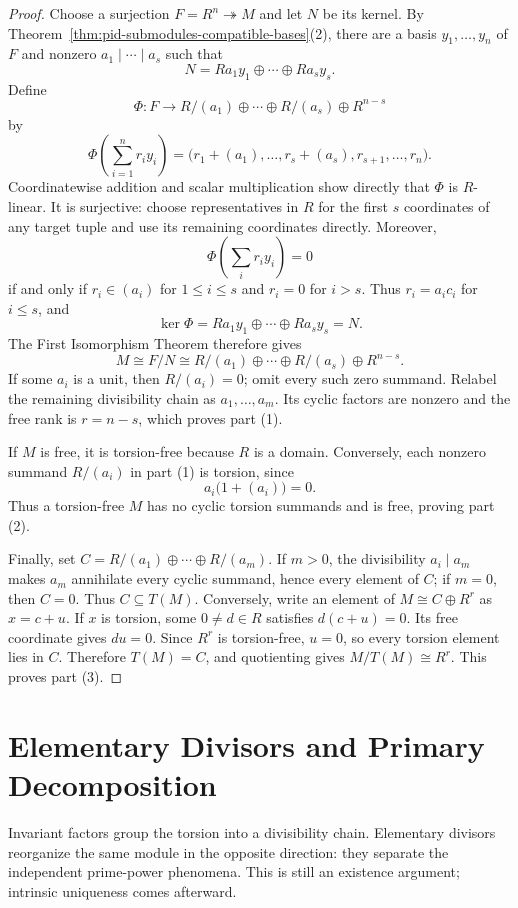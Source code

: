 \begin{proof}
Choose a surjection \(F=R^n\twoheadrightarrow M\) and let \(N\) be its
kernel. By Theorem~\ref{thm:pid-submodules-compatible-bases}(2), there are a basis
\(y_1,\ldots,y_n\) of \(F\) and nonzero \(a_1\mid\cdots\mid a_s\) such that
\[
N=Ra_1y_1\oplus\cdots\oplus Ra_sy_s.
\]
Define
\[
\Phi:F\longrightarrow
R/(a_1)\oplus\cdots\oplus R/(a_s)\oplus R^{n-s}
\]
by
\[
\Phi\left(\sum_{i=1}^n r_iy_i\right)
=\bigl(r_1+(a_1),\ldots,r_s+(a_s),r_{s+1},\ldots,r_n\bigr).
\]
Coordinatewise addition and scalar multiplication show directly that
\(\Phi\) is \(R\)-linear. It is surjective: choose representatives in \(R\)
for the first \(s\) coordinates of any target tuple and use its remaining
coordinates directly. Moreover,
\[
\Phi\left(\sum_i r_iy_i\right)=0
\]
if and only if \(r_i\in(a_i)\) for \(1\leq i\leq s\) and \(r_i=0\) for
\(i>s\). Thus \(r_i=a_ic_i\) for \(i\leq s\), and
\[
\ker\Phi=Ra_1y_1\oplus\cdots\oplus Ra_sy_s=N.
\]
The First Isomorphism Theorem therefore gives
\[
M\cong F/N
\cong R/(a_1)\oplus\cdots\oplus R/(a_s)\oplus R^{n-s}.
\]
If some \(a_i\) is a unit, then \(R/(a_i)=0\); omit every such zero summand.
Relabel the remaining divisibility chain as \(a_1,\ldots,a_m\).  Its cyclic
factors are nonzero and the free rank is \(r=n-s\), which proves part (1).

If \(M\) is free, it is torsion-free because \(R\) is a domain.  Conversely,
each nonzero summand \(R/(a_i)\) in part (1) is torsion, since
\[
a_i\bigl(1+(a_i)\bigr)=0.
\]
Thus a torsion-free \(M\) has no cyclic torsion summands and is free, proving
part (2).

Finally, set \(C=R/(a_1)\oplus\cdots\oplus R/(a_m)\). If \(m>0\), the
divisibility \(a_i\mid a_m\) makes \(a_m\) annihilate every cyclic summand,
hence every element of \(C\); if \(m=0\), then \(C=0\). Thus
\(C\subseteq T(M)\). Conversely, write an element of
\(M\cong C\oplus R^r\) as \(x=c+u\). If \(x\) is torsion, some
\(0\ne d\in R\) satisfies \(d(c+u)=0\). Its free coordinate gives
\(du=0\). Since \(R^r\) is torsion-free, \(u=0\), so every torsion element
lies in \(C\). Therefore \(T(M)=C\), and quotienting gives
\(M/T(M)\cong R^r\). This proves part (3).
\end{proof}

\section{Elementary Divisors and Primary Decomposition}
Invariant factors group the torsion into a divisibility chain.  Elementary
divisors reorganize the same module in the opposite direction: they separate
the independent prime-power phenomena.  This is still an existence argument;
intrinsic uniqueness comes afterward.

